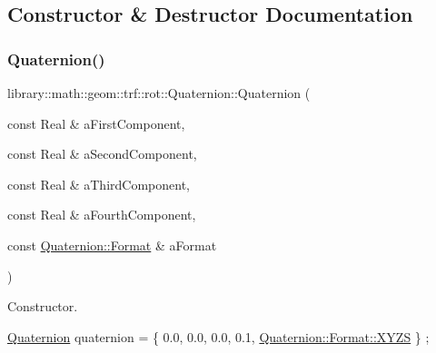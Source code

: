 \subsection{Constructor \& Destructor Documentation}
\mbox{\label{classlibrary_1_1math_1_1geom_1_1trf_1_1rot_1_1_quaternion_aa7f459a08f5af38b9f7676a6bf36a21c}} 
\subsubsection{\texorpdfstring{Quaternion()}{Quaternion()}\hspace{0.1cm}{\footnotesize\ttfamily [1/3]}}
{\footnotesize\ttfamily library\+::math\+::geom\+::trf\+::rot\+::\+Quaternion\+::\+Quaternion (\begin{DoxyParamCaption}\item[{const Real \&}]{a\+First\+Component,  }\item[{const Real \&}]{a\+Second\+Component,  }\item[{const Real \&}]{a\+Third\+Component,  }\item[{const Real \&}]{a\+Fourth\+Component,  }\item[{const \hyperlink{classlibrary_1_1math_1_1geom_1_1trf_1_1rot_1_1_quaternion_a2ca851b117657819310fe5a9b9e5d681}{Quaternion\+::\+Format} \&}]{a\+Format }\end{DoxyParamCaption})}



Constructor. 


\begin{DoxyCode}
\hyperlink{classlibrary_1_1math_1_1geom_1_1trf_1_1rot_1_1_quaternion_aa7f459a08f5af38b9f7676a6bf36a21c}{Quaternion} quaternion = \{ 0.0, 0.0, 0.0, 0.1, \hyperlink{classlibrary_1_1math_1_1geom_1_1trf_1_1rot_1_1_quaternion_a2ca851b117657819310fe5a9b9e5d681a11c51ecd5dc6f86ba3c1ae79e21482f5}{Quaternion::Format::XYZS} \} 
      ;
\end{DoxyCode}



